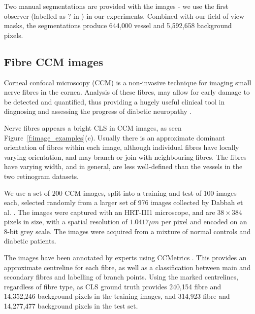 \documentclass{IEEEtran}
\newcommand{\fref}[1]{Figure~\ref{#1}}
\begin{document}
Two manual segmentations are provided with the images - we use the first observer (labelled as ? in \cite{Hoover_etal_TMI00}) in our experiments. Combined with our field-of-view masks, the segmentations produce 644,000 vessel and 5,592,658 background pixels.

\subsection{Fibre CCM images}
\label{s:dataset_fibre}

Corneal confocal microscopy (CCM) is a non-invasive technique for imaging small nerve fibres in the cornea. Analysis of these fibres, may allow for early damage to be detected and quantified, thus providing a hugely useful clinical tool in diagnosing and assessing the progress of diabetic neuropathy \cite{Dabbah_etal_MICCAI10,Dabbah_etal_MIA11}.

Nerve fibres appears a bright CLS in CCM images, as seen \fref{f:image_examples}(c). Usually there is an approximate dominant orientation of fibres within each image, although individual fibres have locally varying orientation, and may branch or join with neighbouring fibres. The fibres have varying width, and in general, are less well-defined than the vessels in the two retinogram datasets.

We use a set of 200 CCM images, split into a training and test of 100 images each, selected randomly from a larger set of 976 images collected by Dabbah et al. \cite{Dabbah_etal_MICCAI10}. The images were captured with an HRT-III1 microscope, and are $38\times384$ pixels in size, with a spatial resolution of $1.0417\mu m$ per pixel and encoded on an 8-bit grey scale. The images were acquired from a mixture of normal controls and diabetic patients.

The images have been annotated by experts using CCMetrics \cite{}. This provides an approximate centreline for each fibre, as well as a classification between main and secondary fibres and labelling of branch points. Using the marked centrelines, regardless of fibre type, as CLS ground truth provides 240,154 fibre and 14,352,246 background pixels in the training images, and 314,923 fibre and 14,277,477 background pixels in the test set.
\end{document}
